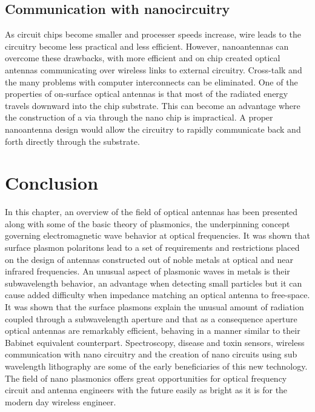 \subsection{Communication with nanocircuitry}
%
As circuit chips become smaller and processer speeds increase, wire leads to the circuitry become less practical and less efficient. However, nanoantennas can overcome these drawbacks, with more efficient and on chip created optical antennas communicating over wireless links to external circuitry. Cross-talk and the many problems with computer interconnects can be eliminated. One of the properties of on-surface optical antennas is that most of the radiated energy travels downward into the chip substrate. This can become an advantage where the construction of a via through the nano chip is impractical.  A proper nanoantenna design would allow the circuitry to rapidly communicate back and forth directly through the substrate.
\section{Conclusion}
%
In this chapter, an overview of the field of optical antennas has been presented along with some of the basic theory of plasmonics, the underpinning concept governing electromagnetic wave behavior at optical frequencies. It was shown that surface plasmon polaritons lead to a set of requirements and restrictions placed on the design of antennas constructed out of noble metals at optical and near infrared frequencies. An unusual aspect of plasmonic waves in metals is their subwavelength behavior, an advantage when detecting small particles but it can cause added difficulty when impedance matching an optical antenna to free-space. It was shown that the surface plasmons explain the unusual amount of radiation coupled through a subwavelength aperture and that as a consequence aperture optical antennas are remarkably efficient, behaving in a manner similar to their Babinet equivalent counterpart. Spectroscopy, disease and toxin sensors, wireless communication with nano circuitry and the creation of nano circuits using sub wavelength lithography are some of the early beneficiaries of this new technology. The field of nano plasmonics offers great opportunities for optical frequency circuit and antenna engineers with the future easily as bright as it is for the modern day wireless engineer.
%
